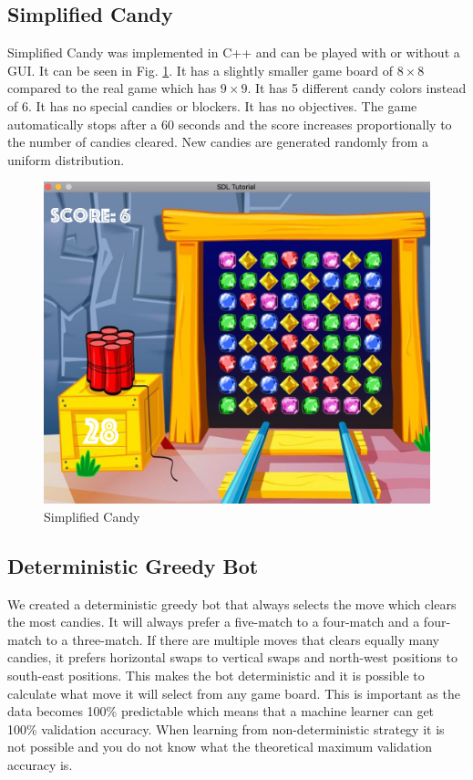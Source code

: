 \documentclass{kththesis}
\begin{document}
\subsection{Simplified Candy}
Simplified Candy was implemented in C++ and can be played with or without a GUI. It can be seen in Fig. \ref{fig:candy_small}. It has a slightly smaller game board of $8\times8$ compared to the real game which has $9\times9$. It has 5 different candy colors instead of 6. It has no special candies or blockers. It has no objectives. The game automatically stops after a 60 seconds and the score increases  proportionally to the number of candies cleared. New candies are generated randomly from a uniform distribution. 
\begin{figure}
\centering
\includegraphics[width=\textwidth]{images/candy_small.png}
\caption{Simplified Candy}
\label{fig:candy_small}
\end{figure}

\subsection{Deterministic Greedy Bot}
We created a deterministic greedy bot that always selects the move which clears the most candies. It will always prefer a five-match to a four-match and a four-match to a three-match. If there are multiple moves that clears equally many candies, it prefers horizontal swaps to vertical swaps  and north-west positions to south-east positions. This makes the bot deterministic and it is possible to calculate what move it will select from any game board. This is important as  the data becomes 100\% predictable which means that a machine learner can get 100\% validation accuracy. When learning from non-deterministic strategy it is not possible and you do not know what the theoretical maximum validation accuracy is.
\end{document}

